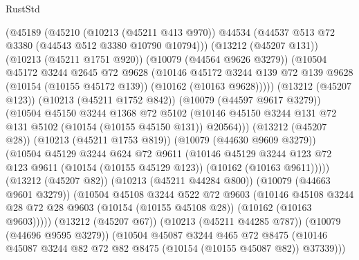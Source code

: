 \begin{lexlean}{RustStd}
\begin{coremodule}
                  (@45189
                    (@45210
                      (@10213 (@45211 @413 @970))
                      @44534
                      (@44537 @513 @72 @3380 (@44543 @512 @3380 @10790 @10794)))
                    (@13212 (@45207 @131))
                    (@10213 (@45211 @1751 @920))
                    (@10079 (@44564 @9626 @3279))
                    (@10504
                      @45172
                      @3244
                      @2645
                      @72
                      @9628
                      (@10146
                        @45172
                        @3244
                        @139
                        @72
                        @139
                        @9628
                        (@10154 (@10155 @45172 @139))
                        (@10162 (@10163 @9628)))))
                  (@13212 (@45207 @123))
                  (@10213 (@45211 @1752 @842))
                  (@10079 (@44597 @9617 @3279))
                  (@10504
                    @45150
                    @3244
                    @1368
                    @72
                    @5102
                    (@10146 @45150 @3244 @131 @72 @131 @5102 (@10154 (@10155 @45150 @131)) @20564)))
                (@13212 (@45207 @28))
                (@10213 (@45211 @1753 @819))
                (@10079 (@44630 @9609 @3279))
                (@10504
                  @45129
                  @3244
                  @624
                  @72
                  @9611
                  (@10146
                    @45129
                    @3244
                    @123
                    @72
                    @123
                    @9611
                    (@10154 (@10155 @45129 @123))
                    (@10162 (@10163 @9611)))))
              (@13212 (@45207 @82))
              (@10213 (@45211 @44284 @800))
              (@10079 (@44663 @9601 @3279))
              (@10504
                @45108
                @3244
                @522
                @72
                @9603
                (@10146
                  @45108
                  @3244
                  @28
                  @72
                  @28
                  @9603
                  (@10154 (@10155 @45108 @28))
                  (@10162 (@10163 @9603)))))
            (@13212 (@45207 @67))
            (@10213 (@45211 @44285 @787))
            (@10079 (@44696 @9595 @3279))
            (@10504
              @45087
              @3244
              @465
              @72
              @8475
              (@10146 @45087 @3244 @82 @72 @82 @8475 (@10154 (@10155 @45087 @82)) @37339)))

\end{coremodule}
\end{lexlean}
